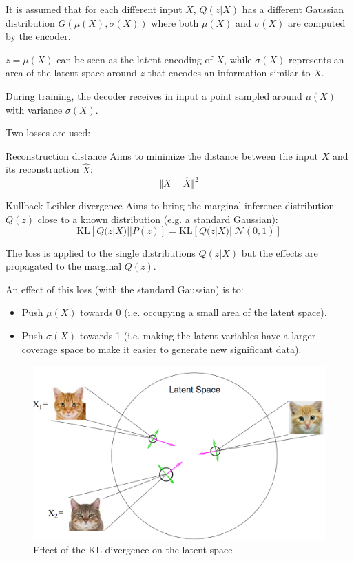 It is assumed that for each different input $X$, $Q(z|X)$ has a different Gaussian distribution $G(\mu(X), \sigma(X))$
where both $\mu(X)$ and $\sigma(X)$ are computed by the encoder.

$z=\mu(X)$ can be seen as the latent encoding of $X$, 
while $\sigma(X)$ represents an area of the latent space around $z$ that encodes an information similar to $X$.

During training, the decoder receives in input a point sampled around $\mu(X)$ with variance $\sigma(X)$.

Two losses are used:
\begin{descriptionlist}
    \item[Reconstruction distance] 
        Aims to minimize the distance between the input $X$ and its reconstruction $\hat{X}$:
        \[ \Vert X - \hat{X} \Vert^2 \]

    \item[Kullback-Leibler divergence] 
        Aims to bring the marginal inference distribution $Q(z)$ close to a known distribution (e.g. a standard Gaussian):
        \[ \text{KL}[ Q(z | X) || P(z) ] = \text{KL}[ Q(z | X) || \mathcal{N}(0, 1) ] \]

        \begin{remark}
            The loss is applied to the single distributions $Q(z | X)$ but the effects are propagated to the marginal $Q(z)$.
        \end{remark}

        \begin{remark}
            An effect of this loss (with the standard Gaussian) is to:
            \begin{itemize}
                \item Push $\mu(X)$ towards 0 (i.e. occupying a small area of the latent space).
                \item Push $\sigma(X)$ towards 1 (i.e. making the latent variables have a larger coverage space to make it easier to generate new significant data).
            \end{itemize}
            \begin{figure}[H]
                \centering
                \includegraphics[width=0.4\linewidth]{./img/kl_vae.png}
                \caption{Effect of the KL-divergence on the latent space}
            \end{figure}
        \end{remark}
\end{descriptionlist}

